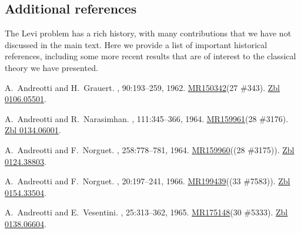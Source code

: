 \documentclass[11pt,a4paper, final, twoside]{article}
\numberwithin{equation}{section}
\begin{document}
\newpage
\begin{appendices}
\section{Additional references}
\label{sec: appendix}
The Levi problem has a rich history, with many contributions that we have not discussed in the main text. Here we provide a list of important historical references, including some more recent results that are of interest to the classical theory we have presented.

\renewcommand{\refname}{}
\makeatletter
\def\@biblabel#1{}
\begin{thebibliography}{100}
\vspace{-1cm}

A.~Andreotti and H.~Grauert.
,
  90:193--259, 1962.
\newblock \href{http://www.ams.org/mathscinet-getitem?mr=150342}{MR150342}(27
  \#343). \href{http://zbmath.org/?q=an:0106.05501}{Zbl 0106.05501}.

A.~Andreotti and R.~Narasimhan.
,
  111:345--366, 1964.
\newblock \href{http://www.ams.org/mathscinet-getitem?mr=159961}{MR159961}(28
  \#3176). \href{http://zbmath.org/?q=an:0134.06001}{Zbl 0134.06001}.

A.~Andreotti and F.~Norguet.
, 258:778--781, 1964.
\newblock \href{http://www.ams.org/mathscinet-getitem?mr=159960}{MR159960}((28
  \#3175)). \href{http://zbmath.org/?q=an:0124.38803}{Zbl 0124.38803}.

A.~Andreotti and F.~Norguet.
, 20:197--241, 1966.
\newblock \href{http://www.ams.org/mathscinet-getitem?mr=199439}{MR199439}((33
  \#7583)). \href{http://zbmath.org/?q=an:0154.33504}{Zbl 0154.33504}.

A.~Andreotti and E.~Vesentini.
, 25:313--362, 1965.
\newblock \href{http://www.ams.org/mathscinet-getitem?mr=175148}{MR175148}(30
  \#5333). \href{http://zbmath.org/?q=an:0138.06604}{Zbl 0138.06604}.


\end{thebibliography}
\end{appendices}
\end{document}
